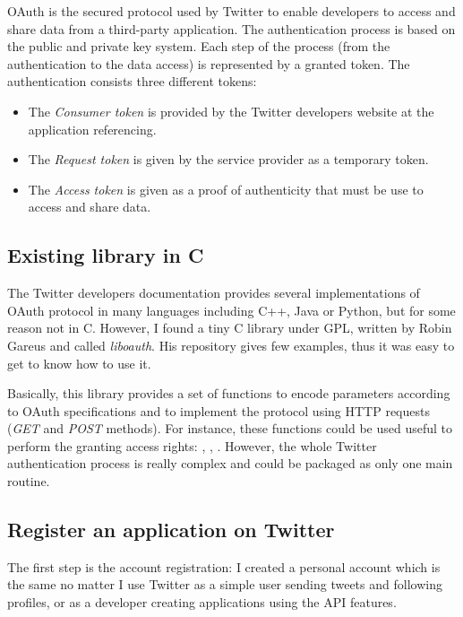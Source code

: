 \clearpage

OAuth is the secured protocol used by Twitter to enable developers to access and share data from a third-party application. The authentication process is based on the public and private key system. Each step of the process (from the authentication to the data access) is represented by a granted token. The authentication consists three different tokens:
\begin{itemize}
\item The \textit{Consumer token} is provided by the Twitter developers website at the application referencing.
\item The \textit{Request token} is given by the service provider as a temporary token.
\item The \textit{Access token} is given as a proof of authenticity that must be use to access and share data.
\end{itemize}


\subsection{Existing library in C}

\hspace{15mm}The Twitter developers documentation provides several implementations of OAuth protocol in many languages including C++, Java or Python, but for some reason not in C. However, I found a tiny C library under GPL, written by Robin Gareus and called \textit{liboauth}. His repository gives few examples, thus it was easy to get to know how to use it.

Basically, this library provides a set of functions to encode parameters according to OAuth specifications and to implement the protocol using HTTP requests (\textit{GET} and \textit{POST} methods). For instance, these functions could be used useful to perform the granting access rights: , , . However, the whole Twitter authentication process is really complex and could be packaged as only one main routine.


\subsection{Register an application on Twitter}

\hspace{15mm}The first step is the account registration: I created a personal account which is the same no matter I use Twitter as a simple user sending tweets and following profiles, or as a developer creating applications using the API features.

